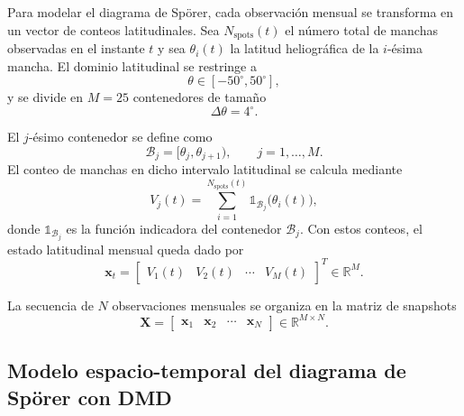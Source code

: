 Para modelar el diagrama de Spörer, cada observación mensual se transforma en un vector de conteos latitudinales. Sea $N_{\mathrm{spots}}(t)$ el número total de manchas observadas en el instante $t$ y sea $\theta_i(t)$ la latitud heliográfica de la $i$-ésima mancha. El dominio latitudinal se restringe a
\begin{equation}
\theta \in [-50^{\circ},50^{\circ}],
\end{equation}
y se divide en $M=25$ contenedores de tamaño
\begin{equation}
\Delta \theta = 4^{\circ}.
\end{equation}

El $j$-ésimo contenedor se define como
\begin{equation}
\mathcal{B}_j=[\theta_j,\theta_{j+1}), \qquad j=1,\ldots,M.
\end{equation}
El conteo de manchas en dicho intervalo latitudinal se calcula mediante
\begin{equation}
V_j(t)=\sum_{i=1}^{N_{\mathrm{spots}}(t)}\mathbb{1}_{\mathcal{B}_j}\big(\theta_i(t)\big),
\end{equation}
donde $\mathbb{1}_{\mathcal{B}_j}$ es la función indicadora del contenedor $\mathcal{B}_j$. Con estos conteos, el estado latitudinal mensual queda dado por
\begin{equation}
\mathbf{x}_t=\begin{bmatrix}
V_1(t) & V_2(t) & \cdots & V_M(t)
\end{bmatrix}^{T}\in\mathbb{R}^{M}.
\end{equation}

La secuencia de $N$ observaciones mensuales se organiza en la matriz de snapshots
\begin{equation}
\mathbf{X}=\begin{bmatrix}
\mathbf{x}_1 & \mathbf{x}_2 & \cdots & \mathbf{x}_N
\end{bmatrix}\in\mathbb{R}^{M\times N}.
\end{equation}


\subsection{Modelo espacio-temporal del diagrama de Spörer con DMD}

